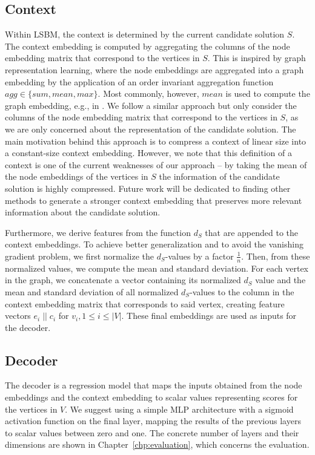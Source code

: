 \documentclass[draft,final]{vutinfth} %
\begin{document}
\subsection{Context}
Within LSBM, the context is determined by the current candidate solution $S$. The context embedding is computed by aggregating the columns of the node embedding matrix that correspond to the vertices in $S$. 
This is inspired by graph representation learning, where the node embeddings are aggregated into a graph embedding by the application of an order invariant aggregation function $\mathit{agg} \in \{\mathit{sum, mean, max}\}$. Most commonly, however, $\mathit{mean}$ is used to compute the graph embedding, e.g., in \cite{Kool2019}. 
We follow a similar approach but only consider the columns of the node embedding matrix that correspond to the vertices in $S$, as we are only concerned about the representation of the candidate solution. 
The main motivation behind this approach is to compress a context of linear size into a constant-size context embedding. 
However, we note that this definition of a context is one of the current weaknesses of our approach -- by taking the mean of the node embeddings of the vertices in $S$ the information of the candidate solution is highly compressed. Future work will be dedicated to finding other methods to generate a stronger context embedding that preserves more relevant information about the candidate solution. 

Furthermore, we derive features from the function $d_S$ that are appended to the context embeddings. To achieve better generalization and to avoid the vanishing gradient problem, we first normalize the $d_S$-values by a factor $\frac{1}{n}$. Then, from these normalized values, we compute the mean and standard deviation. For each vertex in the graph, we concatenate a vector containing its normalized $d_S$ value and the mean and standard deviation of all normalized $d_S$-values to the column in the context embedding matrix that corresponds to said vertex, creating feature vectors $e_i \; || \; c_i$ for $v_i, 1 \leq i \leq |V|$. These final embeddings are used as inputs for the decoder. 

\subsection{Decoder}
The decoder is a regression model that maps the inputs obtained from the node embeddings and the context embedding to scalar values representing scores for the vertices in $V$. We suggest using a simple MLP architecture with a sigmoid activation function on the final layer, mapping the results of the previous layers to scalar values between zero and one. The concrete number of layers and their dimensions are shown in Chapter~\ref{chp:evaluation}, which concerns the evaluation.  
\end{document}
